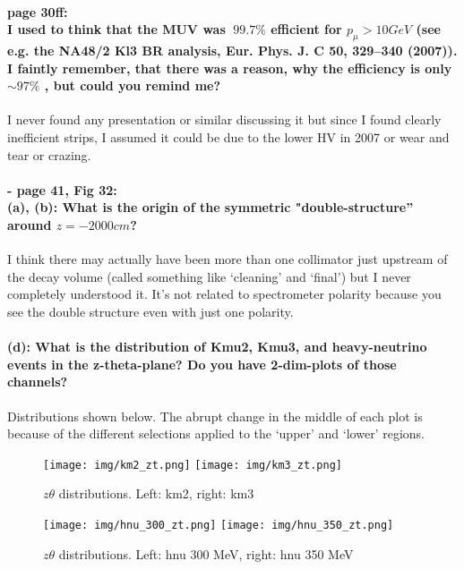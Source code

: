 \documentclass[12pt]{report}
\begin{document}
\paragraph{page 30ff:\\
    I used to think that the MUV was $~99.7\%$ efficient for $p_\mu > 10 GeV$ (see e.g. the NA48/2 Kl3 BR analysis, Eur. Phys. J. C 50, 329–340 (2007)). I faintly remember, that there was a reason, why the efficiency is only $\sim 97 \%$
    , but could you remind me?\\
}

I never found any presentation or similar discussing it but since I found clearly inefficient strips, I assumed it could be due to the lower HV in 2007 or wear and tear or crazing.


\paragraph{- page 41, Fig 32:\\
    (a), (b): What is the origin of the symmetric "double-structure” around $z = -2000 cm$? \\
}
I think there may actually have been more than one collimator just upstream of the decay volume (called something like `cleaning' and `final') but I never completely understood it. It's not related to spectrometer polarity because you see the double structure even with just one polarity.

\clearpage
\paragraph{(d): What is the distribution of Kmu2, Kmu3, and heavy-neutrino events in the z-theta-plane? Do you have 2-dim-plots of those channels? \\
}

Distributions shown below. The abrupt change in the middle of each plot is because of the different selections applied to the `upper' and `lower' regions.

\begin{figure}[b!]
    \texttt{[image: img/km2\_zt.png]}
    \texttt{[image: img/km3\_zt.png]}
    \caption{$z \theta$ distributions. Left: km2, right: km3}
\end{figure}
\begin{figure}[b!]
    \texttt{[image: img/hnu\_300\_zt.png]}
    \texttt{[image: img/hnu\_350\_zt.png]}
    \caption{$z \theta$ distributions. Left: hnu 300 MeV, right: hnu 350 MeV}
\end{figure}
\clearpage
\end{document}
